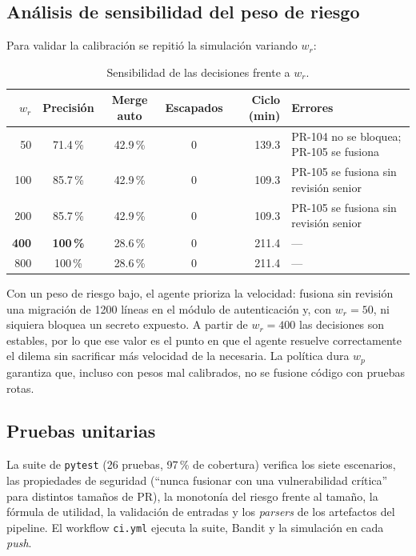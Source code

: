 \documentclass[11pt,a4paper]{article}
\begin{document}
\subsection{Análisis de sensibilidad del peso de riesgo}

Para validar la calibración se repitió la simulación variando $w_r$:

\begin{table}[H]
\centering
\caption{Sensibilidad de las decisiones frente a $w_r$.}
\label{tab:sensibilidad}
\small\setlength{\tabcolsep}{4pt}
\begin{tabular}{@{}r c c c r p{5.2cm}@{}}
\toprule
$w_r$ & \textbf{Precisión} & \textbf{Merge auto} & \textbf{Escapados} & \textbf{Ciclo (min)} & \textbf{Errores} \\
\midrule
50  & 71.4\,\% & 42.9\,\% & 0 & 139.3 & PR-104 no se bloquea; PR-105 se fusiona \\
100 & 85.7\,\% & 42.9\,\% & 0 & 109.3 & PR-105 se fusiona sin revisión senior \\
200 & 85.7\,\% & 42.9\,\% & 0 & 109.3 & PR-105 se fusiona sin revisión senior \\
\textbf{400} & \textbf{100\,\%} & 28.6\,\% & 0 & 211.4 & --- \\
800 & 100\,\% & 28.6\,\% & 0 & 211.4 & --- \\
\bottomrule
\end{tabular}
\end{table}

Con un peso de riesgo bajo, el agente prioriza la velocidad: fusiona sin revisión una migración de
1200 líneas en el módulo de autenticación y, con $w_r=50$, ni siquiera bloquea un secreto expuesto.
A partir de $w_r=400$ las decisiones son estables, por lo que ese valor es el punto en que el agente
resuelve correctamente el dilema sin sacrificar más velocidad de la necesaria. La política dura $w_p$
garantiza que, incluso con pesos mal calibrados, no se fusione código con pruebas rotas.

\subsection{Pruebas unitarias}

La suite de \texttt{pytest} (26 pruebas, 97\,\% de cobertura) verifica los siete escenarios, las
propiedades de seguridad (``nunca fusionar con una vulnerabilidad crítica'' para distintos tamaños de
PR), la monotonía del riesgo frente al tamaño, la fórmula de utilidad, la validación de entradas y
los \textit{parsers} de los artefactos del pipeline. El workflow \texttt{ci.yml} ejecuta la suite, Bandit
y la simulación en cada \textit{push}.
\end{document}
